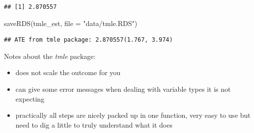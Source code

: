 \documentclass[
]{book}
\newenvironment{Shaded}{\begin{snugshade}}{\end{snugshade}}
\newcommand{\AttributeTok}[1]{\textcolor[rgb]{0.77,0.63,0.00}{#1}}
\newcommand{\DecValTok}[1]{\textcolor[rgb]{0.00,0.00,0.81}{#1}}
\newcommand{\FunctionTok}[1]{\textcolor[rgb]{0.00,0.00,0.00}{#1}}
\newcommand{\NormalTok}[1]{#1}
\newcommand{\OtherTok}[1]{\textcolor[rgb]{0.56,0.35,0.01}{#1}}
\newcommand{\SpecialCharTok}[1]{\textcolor[rgb]{0.00,0.00,0.00}{#1}}
\newcommand{\StringTok}[1]{\textcolor[rgb]{0.31,0.60,0.02}{#1}}
\providecommand{\tightlist}{%
  \setlength{\itemsep}{0pt}\setlength{\parskip}{0pt}}
\begin{document}
\begin{verbatim}
## [1] 2.870557
\end{verbatim}

\begin{Shaded}
\begin{Highlighting}[]
\FunctionTok{saveRDS}\NormalTok{(tmle\_est, }\AttributeTok{file =} \StringTok{"data/tmle.RDS"}\NormalTok{)}
\end{Highlighting}
\end{Shaded}

\begin{Shaded}
\end{Shaded}

\begin{Shaded}
\end{Shaded}

\begin{verbatim}
## ATE from tmle package: 2.870557(1.767, 3.974)
\end{verbatim}

Notes about the \emph{tmle} package:

\begin{itemize}
\tightlist
\item
  does not scale the outcome for you
\item
  can give some error messages when dealing with variable types it is not expecting
\item
  practically all steps are nicely packed up in one function, very easy to use but need to dig a little to truly understand what it does
\end{itemize}
\end{document}
